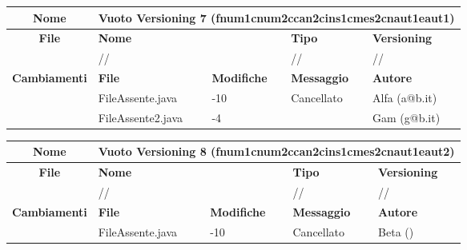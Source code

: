 \begin{table}[ht]
\footnotesize
\begin{tabular}{|c|p{2.5cm}|p{2cm}|p{2.5cm}|p{2.5cm}|}
  \hline
  \textbf{Nome}	& \multicolumn{4}{l|}{Vuoto Versioning 7 (fnum1cnum2ccan2cins1cmes2cnaut1eaut1)} 							\\
  \hline
  \rowcolor{lightgray}\textbf{File} 		& \multicolumn{2}{l|}{\textbf{Nome}}		& \textbf{Tipo}		& \textbf{Versioning} 		\\
						\cline{2-5}
						& \multicolumn{2}{l|}{//}			& //			& //				\\
  \hline
  \rowcolor{lightgray}\textbf{Cambiamenti}	& \textbf{File}		&\textbf{Modifiche}	& \textbf{Messaggio}	& \textbf{Autore}		\\
						\cline{2-5}
						& FileAssente.java	& -10	  		& Cancellato		& Alfa (a@b.it)		\\
						\cline{2-5}
						& FileAssente2.java	& -4	  		& 			& Gam (g@b.it)		\\
  \hline
\end{tabular}
\end{table}

\begin{table}[ht]
\footnotesize
\begin{tabular}{|c|p{2.5cm}|p{2cm}|p{2.5cm}|p{2.5cm}|}
  \hline
  \textbf{Nome}	& \multicolumn{4}{l|}{Vuoto Versioning 8 (fnum1cnum2ccan2cins1cmes2cnaut1eaut2)} 							\\
  \hline
  \rowcolor{lightgray}\textbf{File} 		& \multicolumn{2}{l|}{\textbf{Nome}}		& \textbf{Tipo}		& \textbf{Versioning} 		\\
						\cline{2-5}
						& \multicolumn{2}{l|}{//}			& //			& //				\\
  \hline
  \rowcolor{lightgray}\textbf{Cambiamenti}	& \textbf{File}		&\textbf{Modifiche}	& \textbf{Messaggio}	& \textbf{Autore}		\\
						\cline{2-5}
						& FileAssente.java	& -10	  		& Cancellato		& Beta ()			\\
						
  \hline
\end{tabular}
\end{table}






